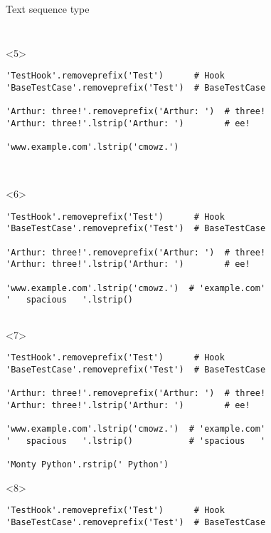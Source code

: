 \begin{frame}[fragile]{Text sequence type}
\begin{columns}[onlytextwidth]
\begin{column}{\textwidth}
\begin{onlyenv}
\begin{lstlisting}[style=python,basicstyle=\small,keepspaces=true,columns=fullflexible]
 \end{lstlisting}
      \end{onlyenv}

      \begin{onlyenv}<5>
        \begin{lstlisting}[style=python,basicstyle=\small,keepspaces=true,columns=fullflexible]
'TestHook'.removeprefix('Test')      # Hook
'BaseTestCase'.removeprefix('Test')  # BaseTestCase

'Arthur: three!'.removeprefix('Arthur: ')  # three!
'Arthur: three!'.lstrip('Arthur: ')        # ee!

'www.example.com'.lstrip('cmowz.')



 \end{lstlisting}
      \end{onlyenv}

      \begin{onlyenv}<6>
        \begin{lstlisting}[style=python,basicstyle=\small,keepspaces=true,columns=fullflexible]
'TestHook'.removeprefix('Test')      # Hook
'BaseTestCase'.removeprefix('Test')  # BaseTestCase

'Arthur: three!'.removeprefix('Arthur: ')  # three!
'Arthur: three!'.lstrip('Arthur: ')        # ee!

'www.example.com'.lstrip('cmowz.')  # 'example.com'
'   spacious   '.lstrip()


 \end{lstlisting}
      \end{onlyenv}

      \begin{onlyenv}<7>
        \begin{lstlisting}[style=python,basicstyle=\small,keepspaces=true,columns=fullflexible]
'TestHook'.removeprefix('Test')      # Hook
'BaseTestCase'.removeprefix('Test')  # BaseTestCase

'Arthur: three!'.removeprefix('Arthur: ')  # three!
'Arthur: three!'.lstrip('Arthur: ')        # ee!

'www.example.com'.lstrip('cmowz.')  # 'example.com'
'   spacious   '.lstrip()           # 'spacious   '

'Monty Python'.rstrip(' Python')
 \end{lstlisting}
      \end{onlyenv}

      \begin{onlyenv}<8>
        \begin{lstlisting}[style=python,basicstyle=\small,keepspaces=true,columns=fullflexible]
'TestHook'.removeprefix('Test')      # Hook
'BaseTestCase'.removeprefix('Test')  # BaseTestCase


\end{lstlisting}
\end{onlyenv}
\end{column}
\end{columns}
\end{frame}

